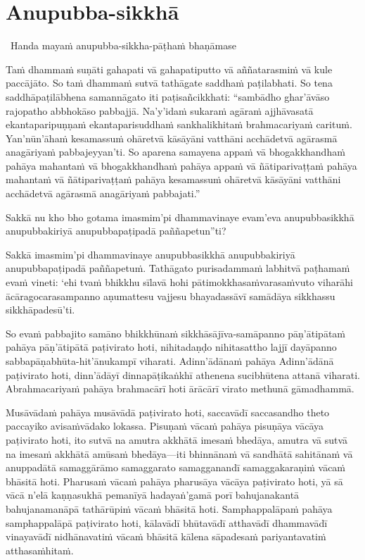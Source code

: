 \suttaRef{[SN 56.11]}


\section{Anupubba-sikkhā}

\begin{leader}
  \anglebracketleft\ \hspace{-0.5mm}Handa mayaṁ anupubba-sikkha-pāṭhaṁ bhaṇāmase \hspace{-0.5mm}\anglebracketright\
\end{leader}

Taṁ dhammaṁ suṇāti gahapati vā gahapatiputto vā aññatarasmiṁ vā kule paccājāto. So taṁ dhammaṁ sutvā tathāgate saddhaṁ paṭilabhati. So tena saddhāpaṭilābhena samannāgato iti paṭisañcikkhati: ``sambādho ghar'āvāso rajopatho abbhokāso pabbajjā. Na'y'idaṁ sukaraṁ agāraṁ ajjhāvasatā ekantaparipuṇṇaṁ ekantaparisuddhaṁ sankhalikhitaṁ brahmacariyaṁ carituṁ. Yan'nūn'āhaṁ kesamassuṁ ohāretvā kāsāyāni vatthāni acchādetvā agārasmā anagāriyaṁ pabbajeyyan'ti. So aparena samayena appaṁ vā bhogakkhandhaṁ pahāya mahantaṁ vā bhogakkhandhaṁ pahāya appaṁ vā ñātiparivaṭṭaṁ pahāya mahantaṁ vā ñātiparivaṭṭaṁ pahāya kesamassuṁ ohāretvā kāsāyāni vatthāni acchādetvā agārasmā anagāriyaṁ pabbajati.''

\suttaRef{[MN 27 / 38 / 51]}

Sakkā nu kho bho gotama imasmim'pi dhammavinaye evam'eva anupubbasikkhā anupubbakiriyā anupubbapaṭipadā paññapetun''ti?

Sakkā imasmim'pi dhammavinaye anupubbasikkhā anupubbakiriyā anupubbapaṭipadā paññapetuṁ. Tathāgato purisadammaṁ labhitvā paṭhamaṁ evaṁ vineti: `ehi tvaṁ bhikkhu sīlavā hohi pātimokkhasaṁvarasaṁvuto viharāhi ācāragocarasampanno aṇumattesu vajjesu bhayadassāvī samādāya sikkhassu sikkhāpadesū'ti.

\suttaRef{[MN 107]}

So evaṁ pabbajito samāno bhikkhūnaṁ sikkhāsājīva-samāpanno pāṇ'ātipātaṁ pahāya pāṇ'ātipātā paṭivirato hoti, nihitadaṇḍo nihitasattho lajjī dayāpanno sabbapāṇabhūta-hit'ānukampī viharati. Adinn'ādānaṁ pahāya Adinn'ādānā paṭivirato hoti, dinn'ādāyī dinnapāṭikaṅkhī athenena sucibhūtena attanā viharati. Abrahmacariyaṁ pahāya brahmacārī hoti ārācārī virato methunā gāmadhammā.

Musāvādaṁ pahāya musāvādā paṭivirato hoti, saccavādī saccasandho theto paccayiko avisaṁvādako lokassa. Pisuṇaṁ vācaṁ pahāya pisuṇāya vācāya paṭivirato hoti, ito sutvā na amutra akkhātā imesaṁ bhedāya, amutra vā sutvā na imesaṁ akkhātā amūsaṁ bhedāya—iti bhinnānaṁ vā sandhātā sahitānaṁ vā anuppadātā samaggārāmo samaggarato samagganandī samaggakaraṇiṁ vācaṁ bhāsitā hoti. Pharusaṁ vācaṁ pahāya pharusāya vācāya paṭivirato hoti, yā sā vācā n'elā kaṇṇasukhā pemanīyā hadayaṅ'gamā porī bahujanakantā bahujanamanāpā tathārūpiṁ vācaṁ bhāsitā hoti. Samphappalāpaṁ pahāya samphappalāpā paṭivirato hoti, kālavādī bhūtavādī atthavādī dhammavādī vinayavādī nidhānavatiṁ vācaṁ bhāsitā kālena sāpadesaṁ pariyantavatiṁ atthasaṁhitaṁ.

